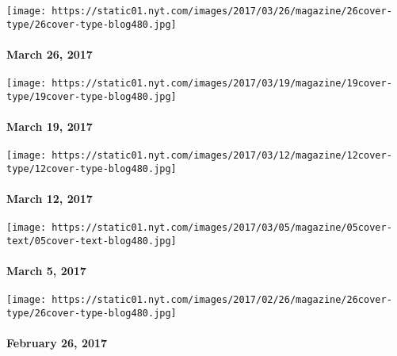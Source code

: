 \href{https://www.nytimes.com/issue/magazine/2017/03/24/magazine-index-20170326}{}

\texttt{[image: https://static01.nyt.com/images/2017/03/26/magazine/26cover-type/26cover-type-blog480.jpg]}

\hypertarget{march-26-2017}{%
\paragraph{March 26, 2017}\label{march-26-2017}}

\href{https://www.nytimes.com/issue/magazine/2017/03/17/31917-20170319}{}

\texttt{[image: https://static01.nyt.com/images/2017/03/19/magazine/19cover-type/19cover-type-blog480.jpg]}

\hypertarget{march-19-2017}{%
\paragraph{March 19, 2017}\label{march-19-2017}}

\href{https://www.nytimes.com/interactive/2017/03/09/magazine/25-songs-that-tell-us-where-music-is-going.html}{}

\texttt{[image: https://static01.nyt.com/images/2017/03/12/magazine/12cover-type/12cover-type-blog480.jpg]}

\hypertarget{march-12-2017}{%
\paragraph{March 12, 2017}\label{march-12-2017}}

\href{https://www.nytimes.com/issue/magazine/2017/03/03/magazine-index-20170305}{}

\texttt{[image: https://static01.nyt.com/images/2017/03/05/magazine/05cover-text/05cover-text-blog480.jpg]}

\hypertarget{march-5-2017}{%
\paragraph{March 5, 2017}\label{march-5-2017}}

\href{https://www.nytimes.com/issue/magazine/2017/02/24/magazine-index-20170226}{}

\texttt{[image: https://static01.nyt.com/images/2017/02/26/magazine/26cover-type/26cover-type-blog480.jpg]}

\hypertarget{february-26-2017}{%
\paragraph{February 26, 2017}\label{february-26-2017}}

